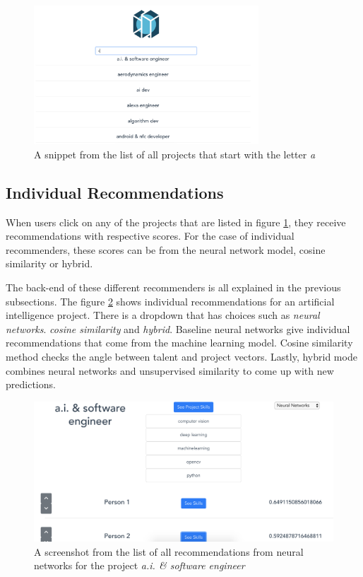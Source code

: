  \begin{figure}[htp]
	\centering
	\includegraphics[width=0.75\textwidth]{figures/DashboardProjects.png}
	\caption{A snippet from the list of all projects that start with the letter \textit{a}}
	\label{fig:dashboard-projects}
\end{figure}

\subsection{Individual Recommendations}

When users click on any of the projects that are listed in figure \ref{fig:dashboard-projects}, they receive recommendations with respective scores. For the case of individual recommenders, these scores can be from the neural network model, cosine similarity or hybrid.

The back-end of these different recommenders is all explained in the previous subsections. The figure \ref{fig:dashboard-individual} shows individual recommendations for an artificial intelligence project. There is a dropdown that has choices such as \textit{neural networks}. \textit{cosine similarity} and \textit{hybrid}. Baseline neural networks give individual recommendations that come from the machine learning model. Cosine similarity method checks the angle between talent and project vectors. Lastly, hybrid mode combines neural networks and unsupervised similarity to come up with new predictions.

 \begin{figure}[htp]
	\centering
	\includegraphics[width=\textwidth]{figures/DashboardIndividual.png}
	\caption{A screenshot from the list of all recommendations from neural networks for the project \textit{a.i. \& software engineer}}
	\label{fig:dashboard-individual}
\end{figure}

